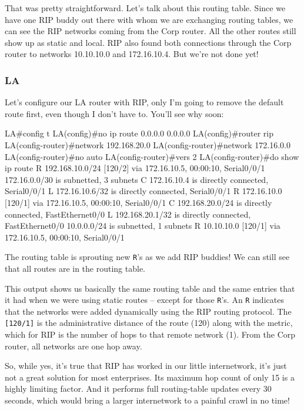 That was pretty straightforward. Let's talk about this routing table.
Since we have one RIP buddy out there with whom we are exchanging
routing tables, we can see the RIP networks coming from the Corp router.
All the other routes still show up as static and local. RIP also found
both connections through the Corp router to networks 10.10.10.0 and
172.16.10.4. But we're not done yet!

\subsubsection{LA}

Let's configure our LA router with RIP, only I'm going to remove the
default route first, even though I don't have to. You'll see why soon:

\begin{cli}
LA#config t
LA(config)#no ip route 0.0.0.0 0.0.0.0
LA(config)#router rip
LA(config-router)#network 192.168.20.0
LA(config-router)#network 172.16.0.0
LA(config-router)#no auto
LA(config-router)#vers 2
LA(config-router)#do show ip route
R    192.168.10.0/24 [120/2] via 172.16.10.5, 00:00:10, Serial0/0/1
     172.16.0.0/30 is subnetted, 3 subnets
C       172.16.10.4 is directly connected, Serial0/0/1
L       172.16.10.6/32 is directly connected, Serial0/0/1
R       172.16.10.0 [120/1] via 172.16.10.5, 00:00:10, Serial0/0/1
C    192.168.20.0/24 is directly connected, FastEthernet0/0
L    192.168.20.1/32 is directly connected, FastEthernet0/0
     10.0.0.0/24 is subnetted, 1 subnets
R       10.10.10.0 [120/1] via 172.16.10.5, 00:00:10, Serial0/0/1
\end{cli}

The routing table is sprouting new \texttt{R}'s as we add RIP buddies!
We can still see that all routes are in the routing table.

This output shows us basically the same routing table and the same
entries that it had when we were using static routes -- except for those
\texttt{R}'s. An \texttt{R} indicates that the networks were added
dynamically using the RIP routing protocol. The \texttt{{[}120/1{]}} is
the administrative distance of the route (120) along with the metric,
which for RIP is the number of hops to that remote network (1). From the
Corp router, all networks are one hop away.

\protect\hypertarget{c09.xhtmlux5cux23Page_396}{}{}So, while yes, it's
true that RIP has worked in our little internetwork, it's just not a
great solution for most enterprises. Its maximum hop count of only 15 is
a highly limiting factor. And it performs full routing-table updates
every 30 seconds, which would bring a larger internetwork to a painful
crawl in no time!

